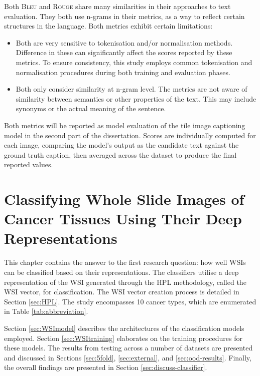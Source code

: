 \documentclass{l4proj}
\begin{document}
Both \textsc{Bleu} and \textsc{Rouge} share many similarities in their approaches to text evaluation. They both use n-grams in their metrics, as a way to reflect certain structures in the language. Both metrics exhibit certain limitations:
\begin{itemize}
    \item Both are very sensitive to tokenisation and/or normalisation methods. Difference in these can significantly affect the scores reported by these metrics. To ensure consistency, this study employs common tokenisation and normalisation procedures during both training and evaluation phases.
    \item Both only consider similarity at n-gram level. The metrics are not aware of similarity between semantics or other properties of the text. This may include synonyms or the actual meaning of the sentence.
\end{itemize}

Both metrics will be reported as model evaluation of the tile image captioning model in the second part of the dissertation. Scores are individually computed for each image, comparing the model's output as the candidate text against the ground truth caption, then averaged across the dataset to produce the final reported values.

\chapter{Classifying Whole Slide Images of Cancer Tissues Using Their Deep Representations} \label{sec:WSI}

This chapter contains the answer to the first research question: how well WSIs can be classified based on their representations. The classifiers utilise a deep representation of the WSI generated through the HPL methodology, called the WSI vector, for classification. The WSI vector creation process is detailed in Section \ref{sec:HPL}. The study encompasses 10 cancer types, which are enumerated in Table \ref{tab:abbreviation}.

Section \ref{sec:WSImodel} describes the architectures of the classification models employed. Section \ref{sec:WSItraining} elaborates on the training procedures for these models. The results from testing across a number of datasets are presented and discussed in Sections \ref{sec:5fold}, \ref{sec:external}, and \ref{sec:ood-results}. Finally, the overall findings are presented in Section \ref{sec:discuss-classifier}. 
\end{document}
